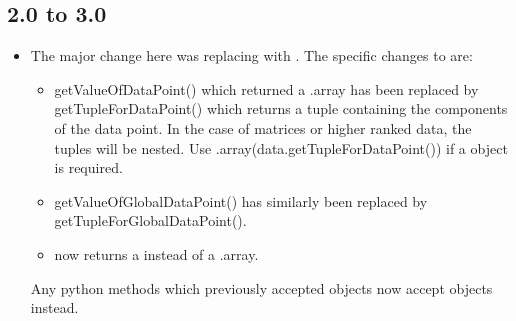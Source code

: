 \subsection*{2.0 to 3.0}
\begin{itemize}
\item The major change here was replacing  with \numpy.
The specific changes to \escript are:
 \begin{itemize}
  \item getValueOfDataPoint() which returned a .array has been
      replaced by getTupleForDataPoint() which returns a \PYTHON tuple
      containing the components of the data point. In the case of matrices or
      higher ranked data, the tuples will be nested.
      Use \numpy.array(data.getTupleForDataPoint()) if a \numpyNDA object is
      required.
  \item getValueOfGlobalDataPoint() has similarly been replaced by
      getTupleForGlobalDataPoint().
  \item {} now returns a \numpyNDA instead of a
      .array.
 \end{itemize}
Any python methods which previously accepted  objects now
accept \numpy objects instead.


\end{itemize}
